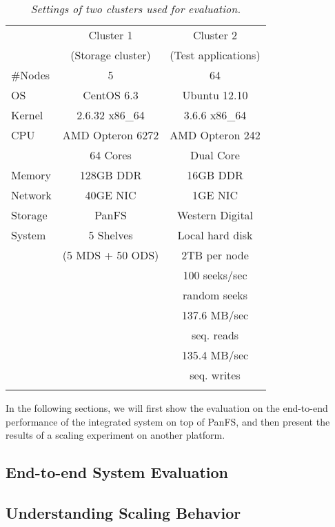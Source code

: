 \begin{footnotesize}
\begin{table}
\begin{tabular}{lcc}
\toprule
      & Cluster 1 & Cluster 2 \\
      & (Storage cluster) & (Test applications)\\
\midrule
\#Nodes & 5 & 64 \\
\hline
OS &   CentOS 6.3 &  Ubuntu 12.10 \\
Kernel & 2.6.32 x86\_64 & 3.6.6 x86\_64 \\
\hline
CPU & AMD Opteron 6272 &  AMD Opteron 242 \\
    & 64 Cores & Dual Core\\
\hline
Memory & 128GB DDR &  16GB DDR \\
\hline
Network & 40GE NIC &  1GE NIC  \\
\hline
Storage & PanFS & Western Digital \\
System &      5 Shelves & Local hard disk  \\
       &   (5 MDS + 50 ODS) &  2TB per node  \\
\hline
& & 100 seeks/sec \\
& & random seeks   \\
& & 137.6 MB/sec  \\
& & seq. reads    \\
& & 135.4 MB/sec  \\
& & seq. writes   \\
\bottomrule \\
\end{tabular}
\caption{
\textit{\footnotesize Settings of two clusters used for evaluation.}
}
\label{tab:setting}
\end{table}
\end{footnotesize}

In the following sections, we will first show the evaluation
on the end-to-end performance of the integrated system on top of PanFS,
and then present the results of a scaling experiment on another platform.

\subsection{End-to-end System Evaluation}
\label{sec:fullsystem}


\subsection{Understanding Scaling Behavior}

